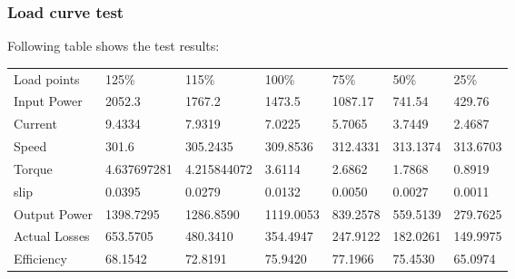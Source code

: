 \subsubsection{Load curve test}
Following table shows the test results:
\begin{table}[hbtp!]
\begin{tabular}{
    >{\columncolor[HTML]{9B9B9B}}l llllll}
    \cellcolor[HTML]{656565}Load points & \cellcolor[HTML]{656565}125\% & \cellcolor[HTML]{656565}115\% & \cellcolor[HTML]{656565}100\% & \cellcolor[HTML]{656565}75\% & \cellcolor[HTML]{656565}50\% & \cellcolor[HTML]{656565}25\% \\
    Input Power                         & 2052.3                        & 1767.2                        & 1473.5                        & 1087.17                      & 741.54                       & 429.76                       \\
    Current                             & 9.4334                        & 7.9319                        & 7.0225                        & 5.7065                       & 3.7449                       & 2.4687                       \\
    Speed                               & 301.6                         & 305.2435                      & 309.8536                      & 312.4331                     & 313.1374                     & 313.6703                     \\
    Torque                              & 4.637697281                   & 4.215844072                   & 3.6114                        & 2.6862                       & 1.7868                       & 0.8919                       \\
    slip                                & 0.0395                        & 0.0279                        & 0.0132                        & 0.0050                       & 0.0027                       & 0.0011                       \\
    Output Power                        & 1398.7295                     & 1286.8590                     & 1119.0053                     & 839.2578                     & 559.5139                     & 279.7625                     \\
    Actual Losses                       & 653.5705                      & 480.3410                      & 354.4947                      & 247.9122                     & 182.0261                     & 149.9975                     \\
    Efficiency                          & 68.1542                       & 72.8191                       & 75.9420                       & 77.1966                      & 75.4530                      & 65.0974                      \\

\end{tabular}
\end{table}
